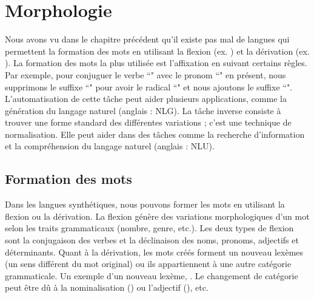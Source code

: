 \documentclass{KodeBook}
\begin{document}
\section{Morphologie}

Nous avons vu dans le chapitre précédent qu'il existe pas mal de langues qui permettent la formation des mots en utilisant la flexion (ex. ) et la dérivation (ex. ). 
La formation des mots la plus utilisée est l'affixation en suivant certains règles. 
Par exemple, pour conjuguer le verbe ``" avec le pronom ``" en présent, nous supprimons le suffixe ``" pour avoir le radical ``" et nous ajoutons le suffixe ``". 
L'automatisation de cette tâche peut aider plusieurs applications, comme la génération du langage naturel (anglais : NLG). 
La tâche inverse consiste à trouver une forme standard des différentes variations ; c'est une technique de normalisation.
Elle peut aider dans des tâches comme la recherche d'information et la compréhension du langage naturel (anglais : NLU).

\subsection{Formation des mots}

Dans les langues synthétiques, nous pouvons former les mots en utilisant la flexion ou la dérivation. 
La flexion génère des variations morphologiques d'un mot selon les traits grammaticaux (nombre, genre, etc.). 
Les deux types de flexion sont la conjugaison des verbes et la déclinaison des noms, pronoms, adjectifs et déterminants.
Quant à la dérivation, les mots créés forment un nouveau lexèmes (un sens différent du mot original) ou ils appartiennent à une autre catégorie grammaticale. 
Un exemple d'un nouveau lexème,  .
Le changement de catégorie peut être dû à la nominalisation () ou l'adjectif (), etc.
\end{document}
